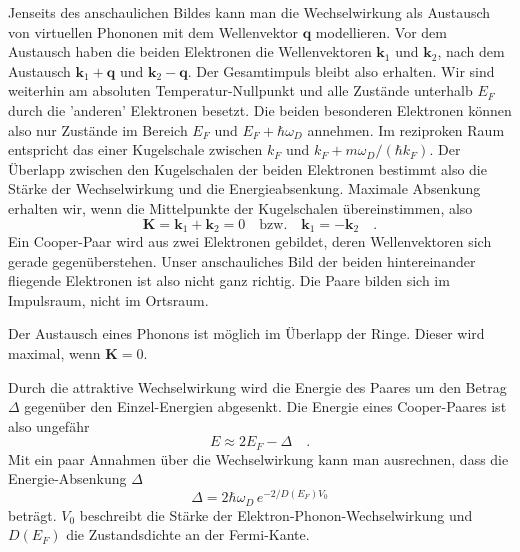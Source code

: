 Jenseits des anschaulichen Bildes kann man die Wechselwirkung als Austausch von virtuellen Phononen mit dem Wellenvektor $\bm{q}$ modellieren. Vor dem Austausch haben die beiden Elektronen die Wellenvektoren $\bm{k}_1$ und $\bm{k}_2$, nach dem Austausch $\bm{k}_1 + \bm{q}$ und $\bm{k}_2 - \bm{q}$. Der Gesamtimpuls bleibt also erhalten. Wir sind weiterhin am absoluten Temperatur-Nullpunkt und alle Zustände unterhalb $E_F$ durch die 'anderen' Elektronen besetzt. Die beiden besonderen Elektronen können  also nur Zustände im Bereich $E_F$ und $E_F + \hbar \omega_D$ annehmen. Im reziproken Raum entspricht das einer Kugelschale zwischen $k_F$ und $k_F + m \omega_D / (\hbar k_F)$. Der Überlapp zwischen den Kugelschalen der beiden Elektronen bestimmt also die Stärke der Wechselwirkung und die  Energieabsenkung. Maximale Absenkung erhalten wir, wenn die Mittelpunkte der Kugelschalen übereinstimmen, also 
\begin{equation}
    \bm{K} = \bm{k}_1 + \bm{k}_2 = 0 \quad \text{bzw.} \quad  \bm{k}_1 = - \bm{k}_2  \quad .
\end{equation}
Ein Cooper-Paar wird  aus zwei Elektronen gebildet, deren Wellenvektoren sich gerade gegenüberstehen. Unser anschauliches Bild der beiden hintereinander fliegende Elektronen ist also nicht ganz richtig. Die Paare bilden sich im Impulsraum, nicht im Ortsraum.

\begin{marginfigure}
    \caption{Der Austausch eines Phonons ist möglich im Überlapp der Ringe. Dieser wird maximal, wenn $\bm{K}= 0$.}
\end{marginfigure}

Durch die attraktive Wechselwirkung wird die Energie des Paares um den Betrag $\Delta$ gegenüber den Einzel-Energien abgesenkt. Die Energie eines Cooper-Paares ist also ungefähr
\begin{equation}
    E \approx 2 E_F - \Delta  \quad .
\end{equation}
Mit ein paar Annahmen über die Wechselwirkung kann man ausrechnen, dass die Energie-Absenkung $\Delta$
\begin{equation}
    \Delta = 2 \hbar \omega_D \, e^{-2 / D(E_F) V_0}
\end{equation}
beträgt. $V_0$ beschreibt die Stärke der Elektron-Phonon-Wechselwirkung und $D(E_F)$ die Zustandsdichte an der Fermi-Kante.

